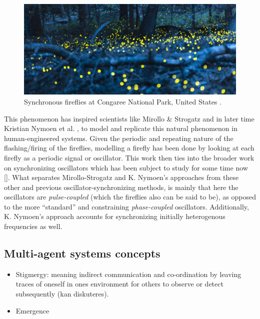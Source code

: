 \begin{figure}[!ht]
	\centering
	\includegraphics[width=0.9\linewidth]{Assets/Figures/synchronized_fireflies_phenomenon.jpg}
	\caption[Picture of fireflies flashing synchronously in a US National Park]{Synchronous fireflies at Congaree National Park, United States \cite{synched_fireflies_phenomenon}.}
	\label{fig:synched_fireflies_phenomenon}
\end{figure}

This phenomenon has inspired scientists like Mirollo \& Strogatz \cite{mirollo_strogatz_PCO_synch} and in later time Kristian Nymoen et al. \cite{nymoen_synch}, to model and replicate this natural phenomenon in human-engineered systems. Given the periodic and repeating nature of the flashing/firing of the fireflies, modelling a firefly has been done by looking at each firefly as a periodic signal or oscillator. This work \cite{mirollo_strogatz_PCO_synch, nymoen_synch} then ties into the broader work on synchronizing oscillators which has been subject to study for some time now []. What separates Mirollo-Strogatz and K. Nymoen's approaches from these other and previous oscillator-synchronizing methods, is mainly that here the oscillators are \textit{pulse-coupled} (which the fireflies also can be said to be), as opposed to the more ``standard'' and constraining \textit{phase-coupled} oscillators. Additionally, K. Nymoen's approach accounts for synchronizing initially heterogenous frequencies as well.

	\subsection{Multi-agent systems concepts}
	
	\begin{itemize}
		\item Stigmergy: meaning indirect communication and co-ordination by leaving traces of oneself in ones environment for others to observe or detect subsequently (kan diskuteres).
		\item Emergence
	\end{itemize}






